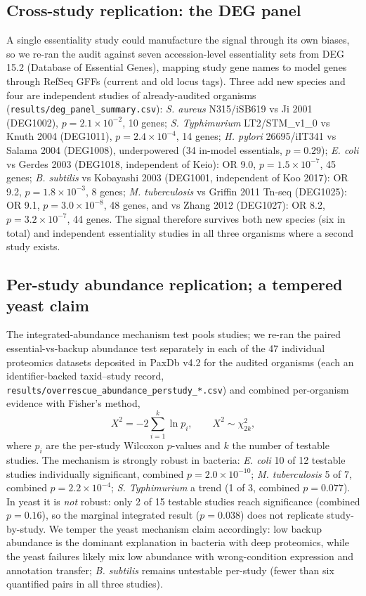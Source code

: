 \documentclass[12pt]{article}
\begin{document}
\subsection{Cross-study replication: the DEG panel}
A single essentiality study could manufacture the signal through its own
biases, so we re-ran the audit against seven accession-level essentiality
sets from DEG 15.2 (Database of Essential Genes), mapping study gene
names to model genes through RefSeq GFFs (current and old locus tags).
Three add new species and four are independent studies of already-audited
organisms (\texttt{results/deg\_panel\_summary.csv}): \emph{S. aureus}
N315/iSB619 vs Ji 2001 (DEG1002), $p=2.1\times10^{-2}$, 10 genes;
\emph{S. Typhimurium} LT2/STM\_v1\_0 vs Knuth 2004 (DEG1011),
$p=2.4\times10^{-4}$, 14 genes; \emph{H. pylori} 26695/iIT341 vs Salama
2004 (DEG1008), underpowered (34 in-model essentials, $p=0.29$);
\emph{E. coli} vs Gerdes 2003 (DEG1018, independent of Keio): OR 9.0,
$p=1.5\times10^{-7}$, 45 genes; \emph{B. subtilis} vs Kobayashi 2003
(DEG1001, independent of Koo 2017): OR 9.2, $p=1.8\times10^{-3}$, 8
genes; \emph{M. tuberculosis} vs Griffin 2011 Tn-seq (DEG1025): OR 9.1,
$p=3.0\times10^{-8}$, 48 genes, and vs Zhang 2012 (DEG1027): OR 8.2,
$p=3.2\times10^{-7}$, 44 genes. The signal therefore survives both new
species (six in total) and independent essentiality studies in all three
organisms where a second study exists.

\subsection{Per-study abundance replication; a tempered yeast claim}
The integrated-abundance mechanism test pools studies; we re-ran the
paired essential-vs-backup abundance test separately in each of the 47
individual proteomics datasets deposited in PaxDb v4.2 for the audited
organisms (each an identifier-backed taxid--study record,
\texttt{results/overrescue\_abundance\_perstudy\_*.csv}) and combined
per-organism evidence with Fisher's method,
\begin{equation}
X^2 = -2 \sum_{i=1}^{k} \ln p_i, \qquad X^2 \sim \chi^2_{2k},
\end{equation}
where $p_i$ are the per-study Wilcoxon $p$-values and $k$ the number of
testable studies. The mechanism is strongly robust in bacteria:
\emph{E. coli} 10 of 12 testable studies individually significant,
combined $p=2.0\times10^{-10}$; \emph{M. tuberculosis} 5 of 7, combined
$p=2.2\times10^{-4}$; \emph{S. Typhimurium} a trend (1 of 3, combined
$p=0.077$). In yeast it is \emph{not} robust: only 2 of 15 testable
studies reach significance (combined $p=0.16$), so the marginal
integrated result ($p=0.038$) does not replicate study-by-study. We
temper the yeast mechanism claim accordingly: low backup abundance is
the dominant explanation in bacteria with deep proteomics, while the
yeast failures likely mix low abundance with wrong-condition expression
and annotation transfer; \emph{B. subtilis} remains untestable per-study
(fewer than six quantified pairs in all three studies).
\end{document}
